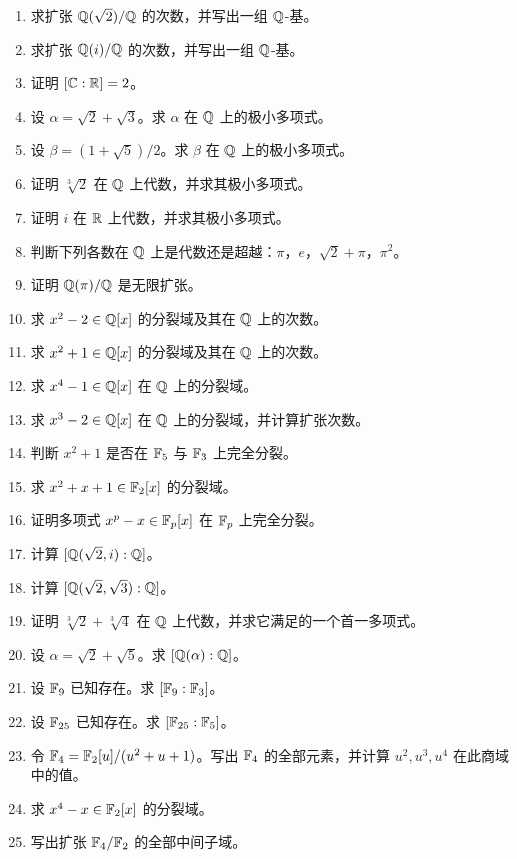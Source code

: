 \begin{enumerate}[label=\arabic*., leftmargin=2.5em]
\item \textbf{\basic} 求扩张 $\mathbb{Q}(\sqrt2)/\mathbb{Q}$ 的次数，并写出一组 $\mathbb{Q}$-基。
\item \textbf{\basic} 求扩张 $\mathbb{Q}(i)/\mathbb{Q}$ 的次数，并写出一组 $\mathbb{Q}$-基。
\item \textbf{\basic} 证明 $[\mathbb{C}:\mathbb{R}]=2$。
\item \textbf{\basic} 设 $\alpha=\sqrt2+\sqrt3$。求 $\alpha$ 在 $\mathbb{Q}$ 上的极小多项式。
\item \textbf{\basic} 设 $\beta=(1+\sqrt5)/2$。求 $\beta$ 在 $\mathbb{Q}$ 上的极小多项式。
\item \textbf{\basic} 证明 $\sqrt[3]{2}$ 在 $\mathbb{Q}$ 上代数，并求其极小多项式。
\item \textbf{\basic} 证明 $i$ 在 $\mathbb{R}$ 上代数，并求其极小多项式。
\item \textbf{\basic} 判断下列各数在 $\mathbb{Q}$ 上是代数还是超越：$\pi$，$e$，$\sqrt2+\pi$，$\pi^2$。
\item \textbf{\basic} 证明 $\mathbb{Q}(\pi)/\mathbb{Q}$ 是无限扩张。
\item \textbf{\basic} 求 $x^2-2\in\mathbb{Q}[x]$ 的分裂域及其在 $\mathbb{Q}$ 上的次数。
\item \textbf{\basic} 求 $x^2+1\in\mathbb{Q}[x]$ 的分裂域及其在 $\mathbb{Q}$ 上的次数。
\item \textbf{\basic} 求 $x^4-1\in\mathbb{Q}[x]$ 在 $\mathbb{Q}$ 上的分裂域。
\item \textbf{\basic} 求 $x^3-2\in\mathbb{Q}[x]$ 在 $\mathbb{Q}$ 上的分裂域，并计算扩张次数。
\item \textbf{\basic} 判断 $x^2+1$ 是否在 $\mathbb{F}_5$ 与 $\mathbb{F}_3$ 上完全分裂。
\item \textbf{\basic} 求 $x^2+x+1\in\mathbb{F}_2[x]$ 的分裂域。
\item \textbf{\basic} 证明多项式 $x^p-x\in\mathbb{F}_p[x]$ 在 $\mathbb{F}_p$ 上完全分裂。
\item \textbf{\basic} 计算 $[\mathbb{Q}(\sqrt2,i):\mathbb{Q}]$。
\item \textbf{\basic} 计算 $[\mathbb{Q}(\sqrt2,\sqrt3):\mathbb{Q}]$。
\item \textbf{\basic} 证明 $\sqrt[3]{2}+\sqrt[3]{4}$ 在 $\mathbb{Q}$ 上代数，并求它满足的一个首一多项式。
\item \textbf{\basic} 设 $\alpha=\sqrt2+\sqrt5$。求 $[\mathbb{Q}(\alpha):\mathbb{Q}]$。
\item \textbf{\basic} 设 $\mathbb{F}_9$ 已知存在。求 $[\mathbb{F}_9:\mathbb{F}_3]$。
\item \textbf{\basic} 设 $\mathbb{F}_{25}$ 已知存在。求 $[\mathbb{F}_{25}:\mathbb{F}_5]$。
\item \textbf{\basic} 令 $\mathbb{F}_4=\mathbb{F}_2[u]/(u^2+u+1)$。写出 $\mathbb{F}_4$ 的全部元素，并计算 $u^2,u^3,u^4$ 在此商域中的值。
\item \textbf{\basic} 求 $x^4-x\in\mathbb{F}_2[x]$ 的分裂域。
\item \textbf{\basic} 写出扩张 $\mathbb{F}_4/\mathbb{F}_2$ 的全部中间子域。
\end{enumerate}

